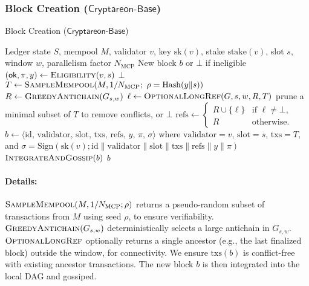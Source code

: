 \documentclass[11pt]{article}
\newcommand{\ProjBase}{\ensuremath{\mathsf{Cryptareon\text{-}Base}}\xspace}
\newcommand{\sk}{\ensuremath{\mathrm{sk}}\xspace}
\newcommand{\stake}{\ensuremath{\mathrm{stake}}\xspace}
\newcommand{\id}{\ensuremath{\mathrm{id}}\xspace}
\newcommand{\val}{\ensuremath{\mathrm{validator}}\xspace}
\newcommand{\slot}{\ensuremath{\mathrm{slot}}\xspace}
\newcommand{\txs}{\ensuremath{\mathrm{txs}}\xspace}
\newcommand{\refs}{\ensuremath{\mathrm{refs}}\xspace}
\newcommand{\Anc}{\ensuremath{\mathrm{Anc}}\xspace}
\newcommand{\Conflicts}{\ensuremath{\mathrm{Conflicts}}\xspace}
\newcommand{\Eligibility}{\ensuremath{\textsc{Eligibility}}\xspace}
\newcommand{\Sign}{\ensuremath{\mathrm{Sign}}\xspace}
\newcommand{\Hash}{\ensuremath{\mathrm{Hash}}\xspace}
\newcommand{\GreedyAntichain}{\textsc{GreedyAntichain}\xspace}
\newcommand{\SampleMempool}{\textsc{SampleMempool}\xspace}
\newcommand{\OptionalLongRef}{\textsc{OptionalLongRef}\xspace}
\newcommand{\IntegrateAndGossip}{\textsc{IntegrateAndGossip}\xspace}
\newcommand{\MCP}{\ensuremath{\mathrm{MCP}}\xspace}
\begin{document}
\subsubsection{Block Creation (\ProjBase)}
\begin{algorithm}[H]
\caption{Block Creation (\ProjBase)}
\label{alg:block-creation}
\begin{algorithmic}[1]
\Require Ledger state $S$, mempool $M$, validator $v$, key $\sk(v)$, stake $\stake(v)$, slot $s$, window $w$, parallelism factor $N_{\MCP}$
\Ensure New block $b$ or $\bot$ if ineligible
\State $(\mathsf{ok}, \pi, y) \gets \Eligibility(v,s)$
 \Return $\bot$ \EndIf
\State $T \gets \SampleMempool(M, 1/N_{\MCP};\ \rho = \Hash(y\|s))$
\State $R \gets \GreedyAntichain(G_{s,w})$
\State $\ell \gets \OptionalLongRef(G, s, w, R, T)$
\If{$\Conflicts(T, \Anc^*(R\cup\{\ell\}\setminus\{\bot\}))$}
  \State prune a minimal subset of $T$ to remove conflicts, or \Return $\bot$
\EndIf
\State $\refs \gets 
\begin{cases}
R \cup \{\ell\} & \text{if }\ell\neq\bot,\\
R & \text{otherwise.}
\end{cases}$
\State $b \gets \langle \id,\,\val,\,\slot,\,\txs,\,\refs,\,y,\,\pi,\,\sigma\rangle$ where $\val=v$, $\slot=s$, $\txs=T$, and $\sigma=\Sign(\sk(v);\id\|\val\|\slot\|\txs\|\refs\|y\|\pi)$
\State $\IntegrateAndGossip(b)$
\State \Return $b$
\end{algorithmic}
\end{algorithm}

\paragraph{Details:} $\SampleMempool(M,1/N_{\MCP};\rho)$ returns a pseudo-random subset of transactions from $M$ using seed $\rho$, to ensure verifiability. $\GreedyAntichain(G_{s,w})$ deterministically selects a large antichain in $G_{s,w}$. $\OptionalLongRef$ optionally returns a single ancestor (e.g., the last finalized block) outside the window, for connectivity. We ensure $\txs(b)$ is conflict-free with existing ancestor transactions. The new block $b$ is then integrated into the local DAG and gossiped.
\end{document}
